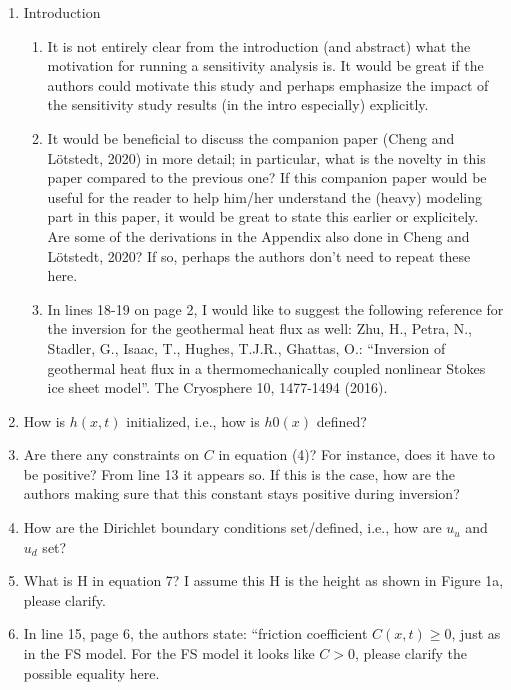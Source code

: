 \documentclass{article}
\begin{document}
\begin{enumerate}
    \item Introduction
    \begin{enumerate}[label=(\alph*)]
        \item It is not entirely clear from the introduction (and abstract) what the motivation for running a sensitivity analysis is. It would be great if the authors could motivate this study and perhaps emphasize the impact of the sensitivity study results (in the intro especially) explicitly.
        
        \item It would be beneficial to discuss the companion paper (Cheng and L\"otstedt, 2020) in more detail; in particular, what is the novelty in this paper compared to the previous one? If this companion paper would be useful for the reader to help him/her understand the (heavy) modeling part in this paper, it would be great to state this earlier or explicitely. Are some of the derivations in the Appendix also done in Cheng and L\"otstedt, 2020? If so, perhaps the authors don’t need to repeat these here.
        
        \item In lines 18-19 on page 2, I would like to suggest the following reference for the inversion for the geothermal heat flux as well: Zhu, H., Petra, N., Stadler, G., Isaac, T., Hughes, T.J.R., Ghattas, O.: “Inversion of geothermal heat flux in a thermomechanically coupled nonlinear Stokes ice sheet model”. The Cryosphere 10, 1477-1494 (2016).
    \end{enumerate}

    \item How is $h(x,t)$ initialized, i.e., how is $h0(x)$ defined?
    
    \item Are there any constraints on $C$ in equation (4)? For instance, does it have to be positive? From line 13 it appears so. If this is the case, how are the authors making sure that this constant stays positive during inversion?

    \item How are the Dirichlet boundary conditions set/defined, i.e., how are $u_u$ and $u_d$ set?
    
    \item What is H in equation 7? I assume this H is the height as shown in Figure 1a, please clarify.
    
    \item In line 15, page 6, the authors state: “friction coefficient $C(x, t)\ge0 $, just as in the FS model. For the FS model it looks like $C > 0$, please clarify the possible equality here.
    

\end{enumerate}
\end{document}

